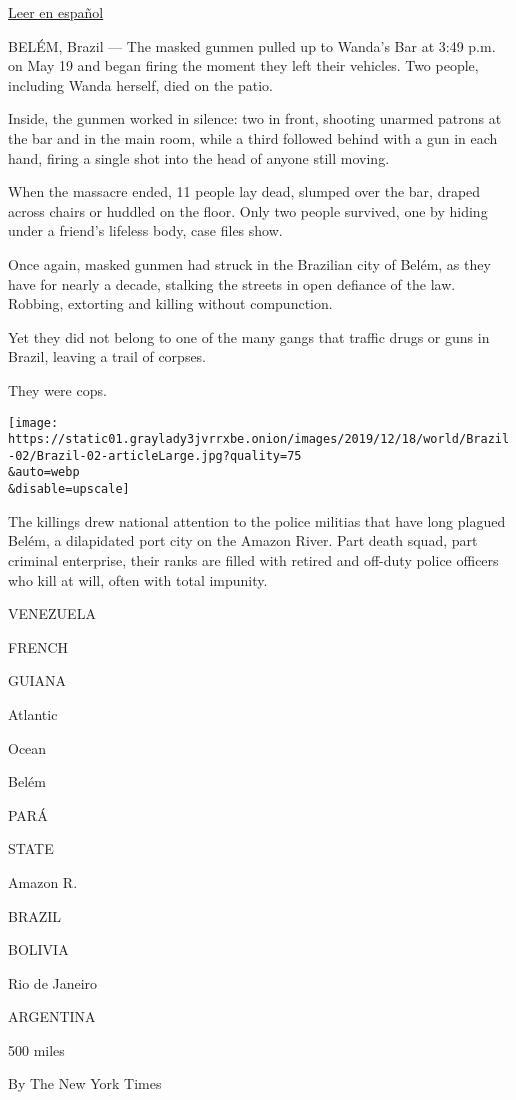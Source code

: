 \href{https://www.nytimes3xbfgragh.onion/es/2019/12/26/espanol/america-latina/policias-brasil-ejecuciones.html}{Leer
en español}

BELÉM, Brazil --- The masked gunmen pulled up to Wanda's Bar at 3:49
p.m. on May 19 and began firing the moment they left their vehicles. Two
people, including Wanda herself, died on the patio.

Inside, the gunmen worked in silence: two in front, shooting unarmed
patrons at the bar and in the main room, while a third followed behind
with a gun in each hand, firing a single shot into the head of anyone
still moving.

When the massacre ended, 11 people lay dead, slumped over the bar,
draped across chairs or huddled on the floor. Only two people survived,
one by hiding under a friend's lifeless body, case files show.

Once again, masked gunmen had struck in the Brazilian city of Belém, as
they have for nearly a decade, stalking the streets in open defiance of
the law. Robbing, extorting and killing without compunction.

Yet they did not belong to one of the many gangs that traffic drugs or
guns in Brazil, leaving a trail of corpses.

They were cops.

\texttt{[image: https://static01.graylady3jvrrxbe.onion/images/2019/12/18/world/Brazil-02/Brazil-02-articleLarge.jpg?quality=75\\\&auto=webp\\\&disable=upscale]}

The killings drew national attention to the police militias that have
long plagued Belém, a dilapidated port city on the Amazon River. Part
death squad, part criminal enterprise, their ranks are filled with
retired and off-duty police officers who kill at will, often with total
impunity.

VENEZUELA

FRENCH

GUIANA

Atlantic

Ocean

Belém

PARÁ

STATE

Amazon R.

BRAZIL

BOLIVIA

Rio de Janeiro

ARGENTINA

500 miles

By The New York Times

